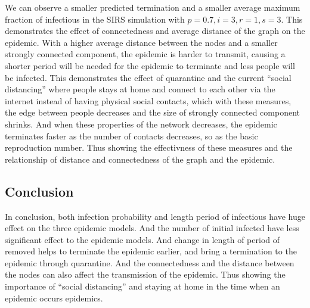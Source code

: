 \documentclass{subfile}
\begin{document}
  We can observe a smaller predicted termination and a smaller average maximum fraction of infectious in the SIRS simulation with \(p=0.7, i=3, r=1, s=3\). This demonstrates the effect of connectedness and average distance of the graph on the epidemic. With a higher average distance between the nodes and a smaller strongly connected component, the epidemic is harder to transmit, causing a shorter period will be needed for the epidemic to terminate and less people will be infected. This demonstrates the effect of quarantine and the current ``social distancing'' where people stays at home and connect to each other via the internet instead of having physical social contacts, which with these measures, the edge between people decreases and the size of strongly connected component shrinks. And when these properties of the network decreases, the epidemic terminates faster as the number of contacts decreases, so as the basic reproduction number. Thus showing the effectivness of these measures and the relationship of distance and connectedness of the graph and the epidemic.

  \subsection{Conclusion}
  In conclusion, both infection probability and length period of infectious have huge effect on the three epidemic models. And the number of initial infected have less significant effect to the epidemic models. And change in length of period of removed helps to terminate the epidemic earlier, and bring a termination to the epidemic through quarantine. And the connectedness and the distance between the nodes can also affect the transmission of the epidemic. Thus showing the importance of ``social distancing'' and staying at home in the time when an epidemic occurs epidemics.
\end{document}
